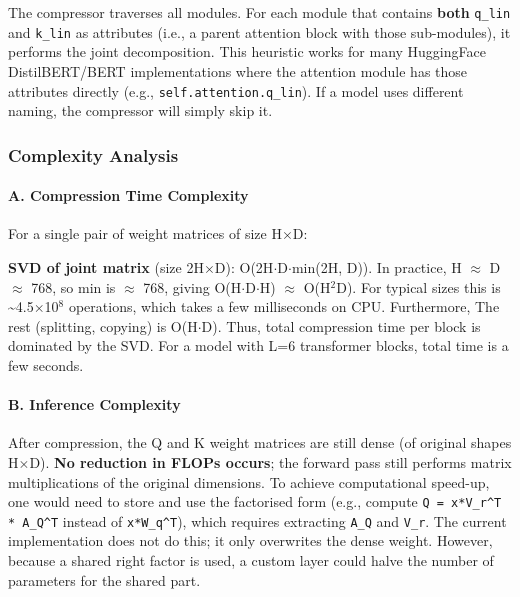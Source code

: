 The compressor traverses all modules. For each module that contains \textbf{both} \texttt{q\_lin} and \texttt{k\_lin} as attributes (i.e., a parent attention block with those sub-modules), it performs the joint decomposition. This heuristic works for many HuggingFace DistilBERT/BERT implementations where the attention module has those attributes directly (e.g., \texttt{self.attention.q\_lin}). If a model uses different naming, the compressor will simply skip it.


\subsubsection*{Complexity Analysis}

\paragraph{A. Compression Time Complexity}

For a single pair of weight matrices of size H$\times$D:

\textbf{SVD of joint matrix} (size 2H$\times$D): O(2H$\cdot$D$\cdot$min(2H, D)). In practice, H $\approx$ D $\approx$ 768, so min is $\approx$ 768, giving O(H$\cdot$D$\cdot$H) $\approx$ O(H$^2$D). For typical sizes this is \textasciitilde{}4.5$\times$10$^8$ operations, which takes a few milliseconds on CPU. Furthermore, The rest (splitting, copying) is O(H$\cdot$D). Thus, total compression time per block is dominated by the SVD. For a model with L=6 transformer blocks, total time is a few seconds.


\paragraph{B. Inference Complexity}

After compression, the Q and K weight matrices are still dense (of original shapes H$\times$D). \textbf{No reduction in FLOPs occurs}; the forward pass still performs matrix multiplications of the original dimensions. To achieve computational speed-up, one would need to store and use the factorised form (e.g., compute \texttt{Q = x*V\_r\textasciicircum{}T * A\_Q\textasciicircum{}T} instead of \texttt{x*W\_q\textasciicircum{}T}), which requires extracting \texttt{A\_Q} and \texttt{V\_r}. The current implementation does not do this; it only overwrites the dense weight. However, because a shared right factor is used, a custom layer could halve the number of parameters for the shared part.

